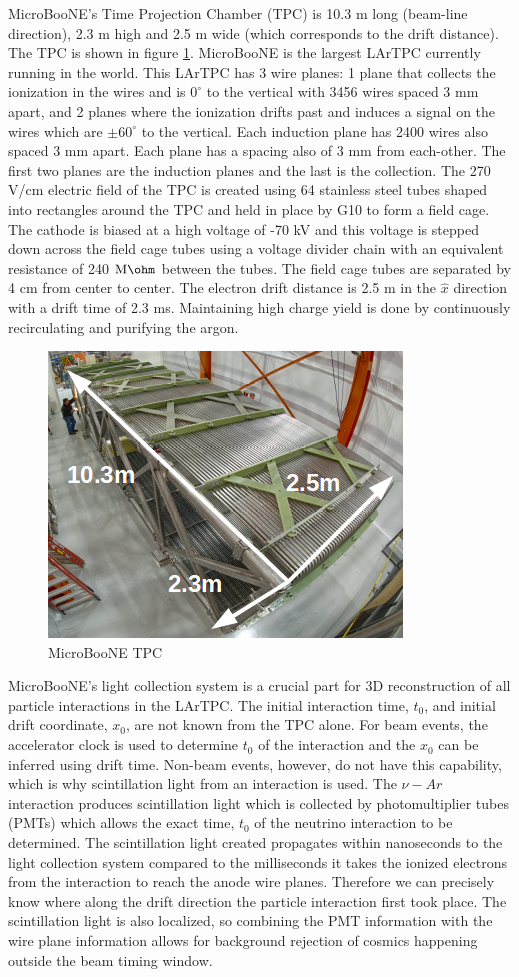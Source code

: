MicroBooNE's Time Projection Chamber (TPC) is 10.3 m long (beam-line direction), 2.3 m high and 2.5 m wide (which corresponds to the drift distance). The TPC is shown in figure \ref{fig:tpc}. MicroBooNE is the largest LArTPC currently running in the world. This LArTPC has 3 wire planes: 1 plane that collects the ionization in the wires and is $0^{\circ}$ to the vertical with 3456 wires spaced 3 mm apart, and 2 planes where the ionization drifts past and induces a signal on the wires which are $\pm 60^{\circ}$ to the vertical. Each induction plane has 2400 wires also spaced 3 mm apart. Each plane has a spacing also of 3 mm from each-other. The first two planes are the induction planes and the last is the collection. The 270 V/cm electric field of the TPC is created using 64 stainless steel tubes shaped into rectangles around the TPC and held in place by G10 to form a field cage. The cathode is biased at a high voltage of -70 kV and this voltage is stepped down across the field cage tubes using a voltage divider chain with an equivalent resistance of 240 $\text{M}\ohm$ between the tubes. The field cage tubes are separated by 4 cm from center to center. The electron drift distance is 2.5 m in the $\hat{x}$ direction with a drift time of 2.3 ms. Maintaining high charge yield is done by continuously recirculating and purifying the argon. 
\begin{figure}[htp!]
\centering
\includegraphics[width=.5\textwidth]{figs/detector1.png}
\caption{MicroBooNE TPC}
\label{fig:tpc}
\end{figure}

MicroBooNE's light collection system is a crucial part for 3D reconstruction of all particle interactions in the LArTPC. The initial interaction time, $t_0$, and initial drift coordinate, $x_0$, are not known from the TPC alone. For beam events, the accelerator clock is used to determine $t_0$ of the interaction and the $x_0$ can be inferred using drift time. Non-beam events, however, do not have this capability, which is why scintillation light from an interaction is used. The $\nu-Ar$ interaction produces scintillation light which is collected by photomultiplier tubes (PMTs) which allows the exact time, $t_0$ of the neutrino interaction to be determined. The scintillation light created propagates within nanoseconds to the light collection system compared to the milliseconds it takes the ionized electrons from the interaction to reach the anode wire planes. Therefore we can precisely know where along the drift direction the particle interaction first took place. The scintillation light is also localized, so combining the PMT information with the wire plane information allows for background rejection of cosmics happening outside the beam timing window.  


